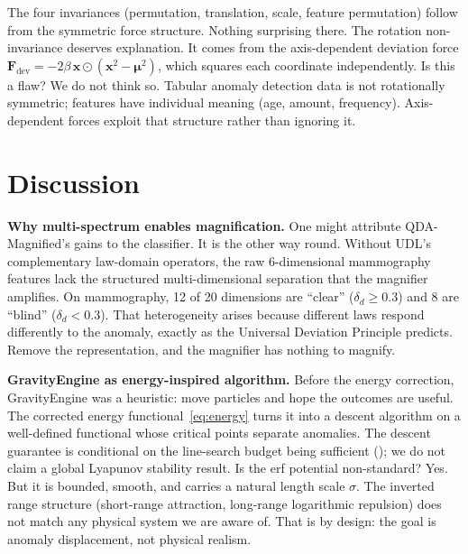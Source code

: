 \documentclass{article}
\begin{document}
The four invariances (permutation, translation, scale, feature permutation) follow from the symmetric force structure. Nothing surprising there. The rotation non-invariance deserves explanation. It comes from the axis-dependent deviation force $\mathbf{F}_{\text{dev}} = -2\beta\,\mathbf{x} \odot (\mathbf{x}^2 - \bm{\mu}^2)$, which squares each coordinate independently. Is this a flaw? We do not think so. Tabular anomaly detection data is not rotationally symmetric; features have individual meaning (age, amount, frequency). Axis-dependent forces exploit that structure rather than ignoring it.

\section{Discussion}
\label{sec:discussion}

\textbf{Why multi-spectrum enables magnification.} One might attribute QDA-Magnified's gains to the classifier. It is the other way round. Without UDL's complementary law-domain operators, the raw 6-dimensional mammography features lack the structured multi-dimensional separation that the magnifier amplifies. On mammography, 12 of 20 dimensions are ``clear'' ($\delta_d \geq 0.3$) and 8 are ``blind'' ($\delta_d < 0.3$). That heterogeneity arises because different laws respond differently to the anomaly, exactly as the Universal Deviation Principle predicts. Remove the representation, and the magnifier has nothing to magnify.

\textbf{GravityEngine as energy-inspired algorithm.} Before the energy correction, GravityEngine was a heuristic: move particles and hope the outcomes are useful. The corrected energy functional~\eqref{eq:energy} turns it into a descent algorithm on a well-defined functional whose critical points separate anomalies. The descent guarantee is conditional on the line-search budget being sufficient (); we do not claim a global Lyapunov stability result. Is the erf potential non-standard? Yes. But it is bounded, smooth, and carries a natural length scale $\sigma$. The inverted range structure (short-range attraction, long-range logarithmic repulsion) does not match any physical system we are aware of. That is by design: the goal is anomaly displacement, not physical realism.
\end{document}
